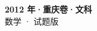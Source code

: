 \documentclass[zihao=-4, a4paper]{ctexart}
\begin{document}
\begin{center}
  {\Large\bfseries 2012 年·重庆卷·文科}\\[4pt]
  {\large 数学 · 试题版}
\end{center}
\medskip
{}

\end{document}
